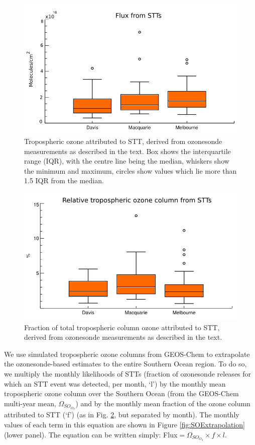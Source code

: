 \documentclass{article}
\begin{document}
  \begin{figure}[!htbp]
    \begin{center}
    \includegraphics[width=0.8\columnwidth]{figures/flux_absolute.png}
    \caption{Tropospheric ozone attributed to STT, derived from ozonesonde measurements as described in the text.
      Box shows the interquartile range (IQR), with the centre line being the median, whiskers show the minimum and maximum, circles show values which lie more than 1.5 IQR from the median.}
    \label{fig:fluxsummaryabs}
    \end{center}
  \end{figure}
  \begin{figure}[!htbp]
    \begin{center}
    \includegraphics[width=0.8\columnwidth]{figures/flux_relative.png}
    \caption{Fraction of total tropospheric column ozone attributed to STT, derived from ozonesonde measurements as described in the text.}
    \label{fig:fluxsummary}
    \end{center}
  \end{figure}
  
  We use simulated tropospheric ozone columns from GEOS-Chem to extrapolate the ozonesonde-based estimates to the entire Southern Ocean region. 
  To do so, we multiply the monthly likelihoods of STTs (fraction of ozonesonde releases for which an STT event was detected, per month, `l') by the monthly mean tropospheric ozone column over the Southern Ocean (from the GEOS-Chem multi-year mean, $\Omega_{SO_{O_3}}$) and by the monthly mean fraction of the ozone column attributed to STT (`f') (as in Fig. \ref{fig:fluxsummary}, but separated by month).
  The monthly values of each term in this equation are shown in Figure \ref{fig:SOExtrapolation} (lower panel).
  The equation can be written simply: Flux$= \Omega_{SO_{O_3}} \times f \times l$.
  
\end{document}
